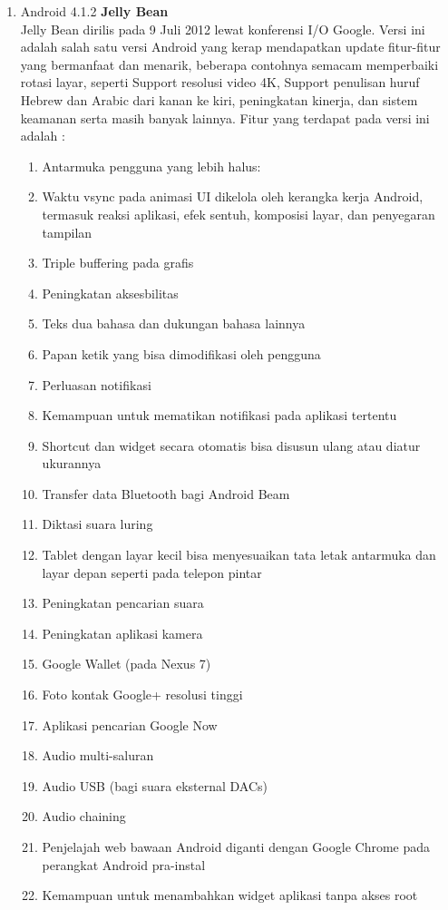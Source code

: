 \begin{enumerate}
\item Android 4.1.2 \textbf{Jelly Bean}\\
Jelly Bean dirilis pada 9 Juli 2012 lewat konferensi I/O Google. Versi ini adalah salah satu versi Android yang kerap mendapatkan update fitur-fitur yang bermanfaat dan menarik, beberapa contohnya semacam memperbaiki rotasi layar, seperti Support resolusi video 4K, Support penulisan huruf Hebrew dan Arabic dari kanan ke kiri, peningkatan kinerja, dan sistem keamanan serta masih banyak lainnya. Fitur yang terdapat pada versi ini adalah : 
\begin{enumerate}
    \item Antarmuka pengguna yang lebih halus:
    \item Waktu vsync pada animasi UI dikelola oleh kerangka kerja Android, termasuk reaksi aplikasi, efek sentuh, komposisi layar, dan penyegaran tampilan
    \item Triple buffering pada grafis
    \item Peningkatan aksesbilitas
    \item Teks dua bahasa dan dukungan bahasa lainnya
    \item Papan ketik yang bisa dimodifikasi oleh pengguna
    \item Perluasan notifikasi
    \item Kemampuan untuk mematikan notifikasi pada aplikasi tertentu
    \item Shortcut dan widget secara otomatis bisa disusun ulang atau diatur ukurannya
    \item Transfer data Bluetooth bagi Android Beam
    \item Diktasi suara luring
    \item Tablet dengan layar kecil bisa menyesuaikan tata letak antarmuka dan layar depan seperti pada telepon pintar
    \item Peningkatan pencarian suara
    \item Peningkatan aplikasi kamera
    \item Google Wallet (pada Nexus 7)
    \item Foto kontak Google+ resolusi tinggi
    \item Aplikasi pencarian Google Now
    \item Audio multi-saluran
    \item Audio USB (bagi suara eksternal DACs)
    \item Audio chaining
    \item Penjelajah web bawaan Android diganti dengan Google Chrome pada perangkat Android pra-instal
    \item Kemampuan untuk menambahkan widget aplikasi tanpa akses root
\end{enumerate}


\end{enumerate}
